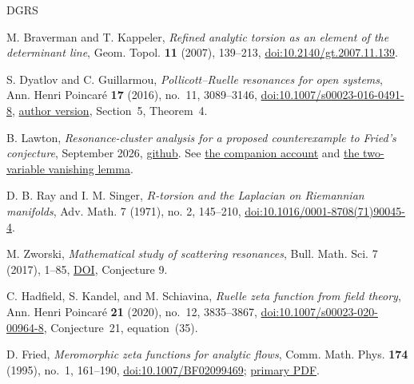 \documentclass[11pt,letterpaper,reqno]{amsart}
\theoremstyle{remark}
\begin{document}
\begin{thebibliography}{DGRS}

 M. Braverman and T. Kappeler,
\emph{Refined analytic torsion as an element of the determinant line},
Geom. Topol. \textbf{11} (2007), 139--213,
\href{https://doi.org/10.2140/gt.2007.11.139}{doi:10.2140/gt.2007.11.139}.

 S. Dyatlov and C. Guillarmou,
\emph{Pollicott--Ruelle resonances for open systems},
Ann. Henri Poincar\'e \textbf{17} (2016), no.~11, 3089--3146,
\href{https://doi.org/10.1007/s00023-016-0491-8}{doi:10.1007/s00023-016-0491-8},
\href{https://math.mit.edu/~dyatlov/files/2014/rnc.pdf}{author version},
Section~5, Theorem~4.

 B. Lawton,
\emph{Resonance-cluster analysis for a proposed counterexample to Fried's conjecture},
September 2026,
\href{https://github.com/blawton/fried-conj-lean/tree/610d659ea15af869553f6e3e79c432880d9b0ab0}{github}.
See \href{https://github.com/blawton/fried-conj-lean/blob/610d659ea15af869553f6e3e79c432880d9b0ab0/docs/counterexample_intuitive_view.tex}{the companion account}
and \href{https://github.com/blawton/fried-conj-lean/blob/610d659ea15af869553f6e3e79c432880d9b0ab0/B1s/fried_crossing_purezeros_9_08.lean}{the two-variable vanishing lemma}.

 D. B. Ray and I. M. Singer,
\emph{$R$-torsion and the Laplacian on Riemannian manifolds},
Adv. Math. 7 (1971), no. 2, 145--210,
\href{https://doi.org/10.1016/0001-8708(71)90045-4}{doi:10.1016/0001-8708(71)90045-4}.

 M. Zworski,
\emph{Mathematical study of scattering resonances},
Bull. Math. Sci. 7 (2017), 1--85,
\href{https://doi.org/10.1007/s13373-017-0099-4}{DOI},
Conjecture 9.

 C. Hadfield, S. Kandel, and M. Schiavina,
\emph{Ruelle zeta function from field theory},
Ann. Henri Poincar\'e \textbf{21} (2020), no.~12, 3835--3867,
\href{https://doi.org/10.1007/s00023-020-00964-8}{doi:10.1007/s00023-020-00964-8},
Conjecture~21, equation~(35).

 D. Fried,
\emph{Meromorphic zeta functions for analytic flows},
Comm. Math. Phys. \textbf{174} (1995), no.~1, 161--190,
\href{https://doi.org/10.1007/BF02099469}{doi:10.1007/BF02099469};
\href{https://projecteuclid.org/journals/communications-in-mathematical-physics/volume-174/issue-1/Meromorphic-zeta-functions-for-analytic-flows/cmp/1104275099.pdf}{primary PDF}.


\end{thebibliography}
\end{document}
